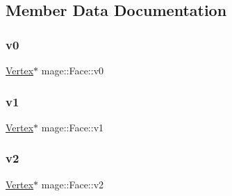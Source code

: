 \subsection{Member Data Documentation}
\hypertarget{structmage_1_1_face_a8a99c634b7b8dbb37ff3eb70308506dd}{}\label{structmage_1_1_face_a8a99c634b7b8dbb37ff3eb70308506dd} 
\subsubsection{\texorpdfstring{v0}{v0}}
{\footnotesize\ttfamily \hyperlink{structmage_1_1_vertex}{Vertex}$\ast$ mage\+::\+Face\+::v0}

\hypertarget{structmage_1_1_face_a811aaac2c5e02052763ebdaef4121da0}{}\label{structmage_1_1_face_a811aaac2c5e02052763ebdaef4121da0} 
\subsubsection{\texorpdfstring{v1}{v1}}
{\footnotesize\ttfamily \hyperlink{structmage_1_1_vertex}{Vertex}$\ast$ mage\+::\+Face\+::v1}

\hypertarget{structmage_1_1_face_a5ad0b031cb4445cef137e1e8b2fa79c8}{}\label{structmage_1_1_face_a5ad0b031cb4445cef137e1e8b2fa79c8} 
\subsubsection{\texorpdfstring{v2}{v2}}
{\footnotesize\ttfamily \hyperlink{structmage_1_1_vertex}{Vertex}$\ast$ mage\+::\+Face\+::v2}

